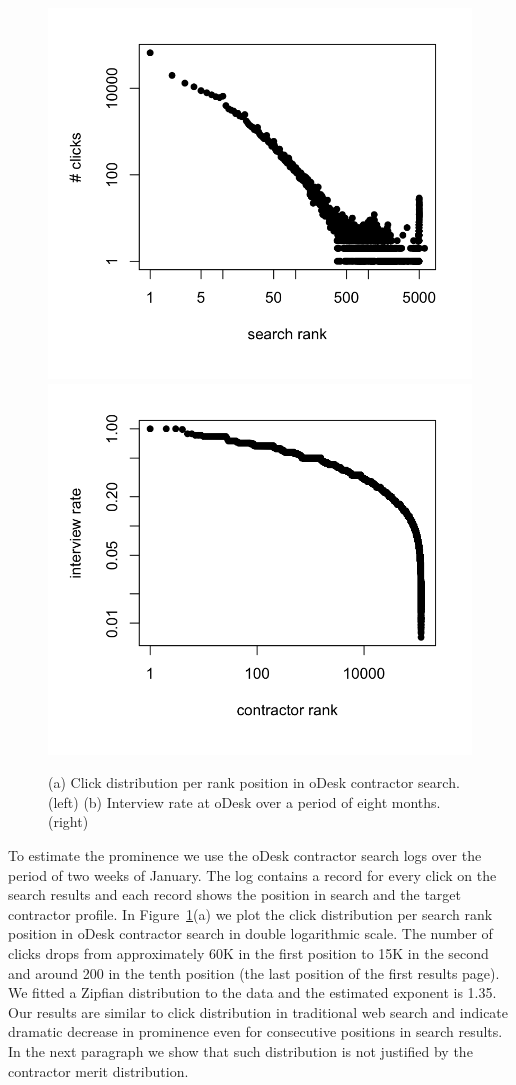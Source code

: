%
%
\begin{figure}[t]
  \includegraphics[width=0.5\columnwidth]{../simulations/results/click_distribution.png}
  \includegraphics[width=0.5\columnwidth]{../simulations/results/interviewrate_distribution.png}
  \caption{(a) Click distribution per rank position in oDesk
    contractor search. (left) (b) Interview rate at oDesk over a
    period of eight months. (right)}
  \label{fig:clicks}
\end{figure}
To estimate the prominence we use the oDesk contractor search logs
over the period of two weeks of January. The log contains a record for
every click on the search results and each record shows the position
in search and the target contractor profile. In
Figure~\ref{fig:clicks}(a) we plot the click distribution per search
rank position in oDesk contractor search in double logarithmic
scale. The number of clicks drops from approximately 60K in the first
position to 15K in the second and around 200 in the tenth position
(the last position of the first results page). We fitted a Zipfian
distribution to the data and the estimated exponent is 1.35. Our
results are similar to click distribution in traditional web search
\cite{ali2007robust} and indicate dramatic decrease in prominence even
for consecutive positions in search results. In the next paragraph we
show that such distribution is not justified by the contractor merit
distribution.

